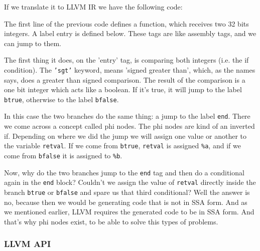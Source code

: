 ﻿\documentclass[10pt,a4paper,twocolumn,twoside]{article}
\begin{document}
If we translate it to LLVM IR we have the following code:

\begin{scriptsize}
\end{scriptsize}

The first line of the previous code defines a function, which receives two
32 bits integers. A label entry is defined below. These tags are like assembly
tags, and we can jump to them.

The first thing it does, on the 'entry' tag, is comparing both integers (i.e.
the if condition). The \texttt{'sgt'} keyword, means 'signed greater than',
which, as the names says, does a greater than signed comparison. The result of
the comparison is a one bit integer which acts like a boolean. If it's true, it
will jump to the label \texttt{btrue}, otherwise to the label \texttt{bfalse}.

In this case the two branches do the same thing: a jump to the label
\texttt{end}. There we come across a concept called phi nodes. The phi nodes
are kind of an inverted if. Depending on where we did the jump we will assign
one value or another to the variable \texttt{retval}. If we come from
\texttt{btrue}, \texttt{retval} is assigned \texttt{\%a}, and if we come from 
\texttt{bfalse} it is assigned to \texttt{\%b}.

Now, why do the two branches jump to the \texttt{end} tag and then do a
conditional again in the \texttt{end} block? Couldn't we assign the value of
\texttt{retval} directly inside the branch \texttt{btrue} or \texttt{bfalse} and
spare us that third conditional? Well the answer is no, because then we would be
generating code that is not in SSA form. And as we mentioned earlier, LLVM
requires the generated code to be in SSA form. And that's why phi nodes exist,
to be able to solve this types of problems.

\subsubsection{LLVM API}
\end{document}
